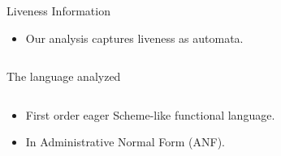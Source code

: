 \documentclass[xcolor=x11names,compress,mathserif]{beamer}
\renewcommand{\(}{\begin{columns}}
\renewcommand{\)}{\end{columns}}
\newcommand{\<}[1]{\begin{column}{#1}}
\renewcommand{\>}{\end{column}}
\begin{document}
\begin{frame}{Liveness Information}
  \begin{itemize}
  \item Our analysis captures liveness as automata.
  \end{itemize}
\begin{columns}
  \begin{column}[T]{0.5\textwidth}

  \end{column}
  \begin{column}[T]{0.5\textwidth}
    
  \end{column}
\end{columns}
\end{frame}


\begin{frame}{The language analyzed}
\begin{columns}
  \begin{column}[T]{0.45\textwidth}
\small
    \begin{itemize} \itemsep0.75em
    \item First order eager Scheme-like functional language.
    \item In Administrative Normal Form (ANF).
    \end{itemize}
\normalsize
  \end{column}
  \begin{column}[T]{0.55\textwidth}
    
  \end{column}
\end{columns}
\end{frame}


\end{document}
